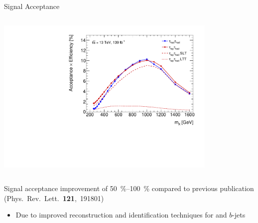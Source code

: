 \documentclass[11pt, xcolor={dvipsnames}, aspectratio=169]{beamer}
\begin{document}
\begin{frame}{Signal Acceptance}

  \vspace*{-1em}

  \begin{columns}[onlytextwidth, t]
    \centering


    \vspace{1.5em}


    \centering


    \includegraphics[width=0.8\textwidth]{selection/acceptance_resonant}
  \end{columns}

  \alert{Signal acceptance improvement of \SIrange{50}{100}{\percent}} compared
  to previous publication {\scriptsize (Phys.~Rev.~Lett.~\textbf{121},~191801)}
  \begin{itemize}

  \item Due to improved reconstruction and identification techniques for
    \tauhadvis and $b$-jets

  \end{itemize}
\end{frame}
\end{document}
